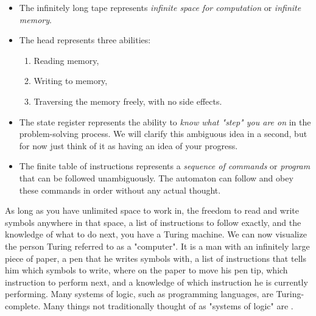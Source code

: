 \begin{itemize}
	\item The infinitely long tape represents \textit{infinite space for computation} or \textit{infinite memory}.
	\item The head represents three abilities:
		\begin{enumerate}
			\item Reading memory,
			\item Writing to memory,
			\item Traversing the memory freely, with no side effects.
		\end{enumerate}
	\item The state register represents the ability to \textit{know what "step" you are on} in the problem-solving process. We will clarify this ambiguous idea in a second, but for now just think of it as having an idea of your progress.
	\item The finite table of instructions represents a \textit{sequence of commands} or \textit{program} that can be followed unambiguously. The automaton can follow and obey these commands in order without any actual thought.
\end{itemize}

As long as you have unlimited space to work in, the freedom to read and write symbols anywhere in that space, a list of instructions to follow exactly, and the knowledge of what to do next, you have a Turing machine. We can now visualize the person Turing referred to as a "computer". It is a man with an infinitely large piece of paper, a pen that he writes symbols with, a list of instructions that tells him which symbols to write, where on the paper to move his pen tip, which instruction to perform next, and a knowledge of which instruction he is currently performing. Many systems of logic, such as programming languages, are Turing-complete. Many things not traditionally thought of as "systems of logic" are . \\\\

